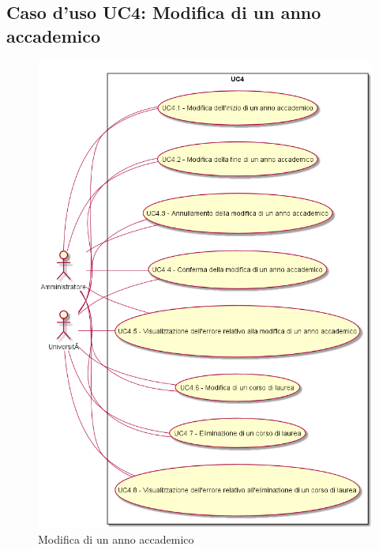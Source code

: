 \subsection{Caso d'uso \texorpdfstring{UC4}{UC4}: Modifica di un anno accademico}
\begin{figure} [H]
\centering
\includegraphics[scale=0.45]{./img/UC4.png}
\caption{Modifica di un anno accademico}\label{}
\end{figure}
